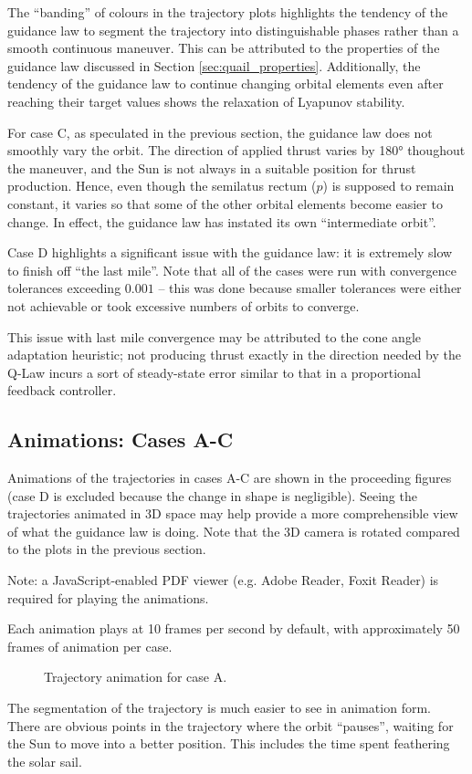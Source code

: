 \newpage
The ``banding'' of colours in the trajectory plots highlights the tendency of the guidance law to segment the trajectory into distinguishable phases rather than a smooth continuous maneuver. This can be attributed to the properties of the guidance law discussed in Section \ref{sec:quail_properties}. Additionally, the tendency of the guidance law to continue changing orbital elements even after reaching their target values shows the relaxation of Lyapunov stability.

For case C, as speculated in the previous section, the guidance law does not smoothly vary the orbit. The direction of applied thrust varies by \ang{180} thoughout the maneuver, and the Sun is not always in a suitable position for thrust production. Hence, even though the semilatus rectum (\(p\)) is supposed to remain constant, it varies so that some of the other orbital elements become easier to change. In effect, the guidance law has instated its own ``intermediate orbit''.

Case D highlights a significant issue with the guidance law: it is extremely slow to finish off ``the last mile''. Note that all of the cases were run with convergence tolerances exceeding \(0.001\) -- this was done because smaller tolerances were either not achievable or took excessive numbers of orbits to converge.

This issue with last mile convergence may be attributed to the cone angle adaptation heuristic; not producing thrust exactly in the direction needed by the Q-Law incurs a sort of steady-state error similar to that in a proportional feedback controller.

\subsection{Animations: Cases A-C}
Animations of the trajectories in cases A-C are shown in the proceeding figures (case D is excluded because the change in shape is negligible). Seeing the trajectories animated in 3D space may help provide a more comprehensible view of what the guidance law is doing. Note that the 3D camera is rotated compared to the plots in the previous section.

Note: a JavaScript-enabled PDF viewer (e.g. Adobe Reader, Foxit Reader) is required for playing the animations.

Each animation plays at 10 frames per second by default, with approximately 50 frames of animation per case.

\begin{figure}[H]
    \caption{Trajectory animation for case A.}
    \label{fig:anim_a}
\end{figure}
The segmentation of the trajectory is much easier to see in animation form. There are obvious points in the trajectory where the orbit ``pauses'', waiting for the Sun to move into a better position. This includes the time spent feathering the solar sail.

